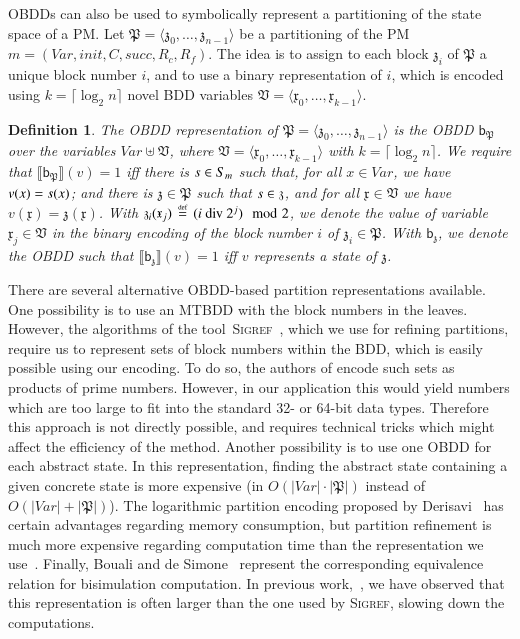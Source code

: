 \documentclass[10pt,twocolumn]{article}
\newtheorem{definition}{Definition}
\newcommand{\SIGREF}{\textsc{Sigref}\xspace}
\newcommand{\states} {{\ensuremath S}}
\newcommand{\state}  {{\ensuremath s}}
\newcommand{\apart}{\mathfrak{P}}
\newcommand{\avar}{\mathfrak{x}}
\newcommand{\avars}{\mathfrak{V}}
\newcommand{\astate}{\mathfrak{z}}
\newcommand{\bdd}{\mathsf{b}}
\newcommand{\prismModel}{m}
\newcommand{\prismVar}{x}
\newcommand{\prismVars}{\mathit{Var}}
\newcommand{\prismInit}{\mathit{init}}
\newcommand{\prismSucc}{\mathit{succ}}
\newcommand{\prismCmds}{C}
\newcommand{\prismCRew}{R_c}
\newcommand{\prismFRew}{R_f}
\newcommand{\defeq}{\,\stackrel{\mbox{\rm {\tiny def}}}{=}\,}
\newcommand{\sem}[1]{\ensuremath{\llbracket #1 \rrbracket}\xspace}
\begin{document}
OBDDs can also be used to symbolically represent a partitioning of the state space of a PM.
Let $\apart = \langle\astate_0,\ldots,\astate_{n-1}\rangle$ be a partitioning of the PM $\prismModel = (\prismVars, \prismInit, \prismCmds, \prismSucc, \prismCRew, \prismFRew)$.
The idea is to assign to each block $\astate_i$ of $\apart$ a unique block number $i$, and to use a binary representation of $i$, which is encoded using $k = \lceil \log_2 n\rceil$ novel BDD variables $\avars = \langle\avar_0,\ldots,\avar_{k-1} \rangle$.
\begin{definition}
  \label{def:bdd-partitioning}
The \emph{OBDD representation} of $\apart = \langle\astate_0,\ldots,\astate_{n-1}\rangle$ is the OBDD $\bdd_\apart$ over the variables $\prismVars\uplus\avars$, where $\avars = \langle\avar_0,\ldots,\avar_{k-1} \rangle$ with $k = \lceil \log_2 n\rceil$.
  We require that $\sem{\bdd_\apart}(v) = 1$ iff there is $\state \in \states_\prismModel$ such that, for all $\prismVar \in \prismVars$,
  we have $v(\prismVar) = \state(\prismVar)$; and there is $\astate \in \apart$ such that $\state \in \astate$, and for all $\avar \in \avars$ we have $v(\avar) = \astate(\avar)$.
  With $\astate_i(\avar_j) \defeq (i\ \mathrm{div}\ 2^j) \mod 2$, we denote the value of variable $\avar_j \in \avars$ in the binary encoding of the block number $i$ of $\astate_i \in \apart$.
  With $\bdd_\astate$, we denote the OBDD such that $\sem{\bdd_\astate}(v) = 1$ iff $v$ represents a state of $\astate$.
\end{definition}

There are several alternative OBDD-based partition representations available.
One possibility is to use an MTBDD with the block numbers in the leaves.
However, the algorithms of the tool~\SIGREF~\cite{wimmer-et-al-atva-2006}, which we use
for refining partitions, require us to represent sets of block numbers within the BDD, 
which is easily possible using our encoding. To do so, the authors of \cite{Santos13}
encode such sets as products of prime numbers. However, in our application this would yield numbers which are too 
large to fit into the standard 32- or 64-bit data types. Therefore this approach is not directly 
possible, and requires technical tricks which might affect the efficiency of the method.
Another possibility is to use one OBDD for each abstract state. In this representation,
finding the abstract state containing a given concrete state is more expensive
(in $O(|\prismVars|\cdot |\apart|)$ instead of $O(|\prismVars|+|\apart|)$).
The logarithmic partition encoding proposed by Derisavi~\cite{Der07a} has certain advantages 
regarding memory consumption, but partition refinement is much more expensive regarding 
computation time than the representation we use~\cite{wimmer-et-al-perfeval-2010}.
Finally, Bouali and de Simone~\cite{BdS92} represent the corresponding equivalence
relation for bisimulation computation. In previous work,~\cite{wimmer-et-al-atva-2006},
we have observed that this representation is often larger than the one used by \SIGREF, 
slowing down the computations.
\end{document}
